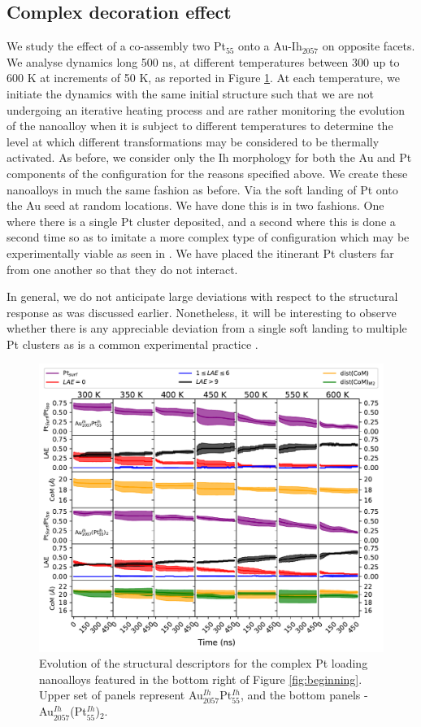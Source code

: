 \subsection{Complex decoration effect}

We study the effect of a co-assembly two Pt$_{55}$ onto a Au-Ih$_{2057}$ on opposite facets. We analyse dynamics long 500 ns, at different temperatures between 300 up to 600 K at increments of 50 K, as reported in Figure \ref{fig:micki}. At each temperature, we initiate the dynamics with the same initial structure such that we are not undergoing an iterative heating process and are rather monitoring the evolution of the nanoalloy when it is subject to different temperatures to determine the level at which different transformations may be considered to be thermally activated. As before, we consider only the Ih morphology for both the Au and Pt components of the configuration for the reasons specified above. We create these nanoalloys in much the same fashion as before. Via the soft landing of Pt onto the Au seed at random locations. We have done this is in two fashions. One where there is a single Pt cluster deposited, and a second where this is done a second time so as to imitate a more complex type of configuration which may be experimentally viable as seen in \cite{Jorge2019}. We have placed the itinerant Pt clusters far from one another so that they do not interact.

In general, we do not anticipate large deviations with respect to the structural response as was discussed earlier. Nonetheless, it will be interesting to observe whether there is any appreciable deviation from a single soft landing to multiple Pt clusters as is a common experimental practice \cite{JorgeStructure}.

\begin{figure}
\centering
    \includegraphics[width=\linewidth]{figures/MD/Coal/Micki.pdf}
    \caption{Evolution of the structural descriptors for the complex Pt loading nanoalloys featured in the bottom right of Figure \ref{fig:beginning}. Upper set of panels represent Au$_{2057}^{Ih}$Pt$_{55}^{Ih}$, and the bottom panels - Au$_{2057}^{Ih}$(Pt$_{55}^{Ih}$)$_{2}$.}
    \label{fig:micki}
\end{figure}

